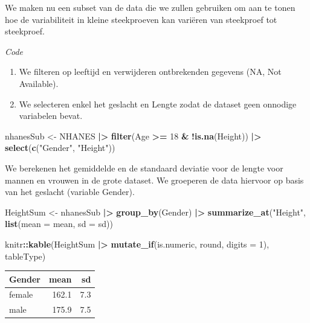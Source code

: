 \documentclass[
  12pt,dutch]{book}
\newenvironment{Shaded}{\begin{snugshade}}{\end{snugshade}}
\newcommand{\AttributeTok}[1]{\textcolor[rgb]{0.13,0.29,0.53}{#1}}
\newcommand{\DecValTok}[1]{\textcolor[rgb]{0.00,0.00,0.81}{#1}}
\newcommand{\FunctionTok}[1]{\textcolor[rgb]{0.13,0.29,0.53}{\textbf{#1}}}
\newcommand{\NormalTok}[1]{#1}
\newcommand{\OtherTok}[1]{\textcolor[rgb]{0.56,0.35,0.01}{#1}}
\newcommand{\SpecialCharTok}[1]{\textcolor[rgb]{0.81,0.36,0.00}{\textbf{#1}}}
\newcommand{\StringTok}[1]{\textcolor[rgb]{0.31,0.60,0.02}{#1}}
\providecommand{\tightlist}{%
  \setlength{\itemsep}{0pt}\setlength{\parskip}{0pt}}
\theoremstyle{definition}
\theoremstyle{definition}
\theoremstyle{definition}
\theoremstyle{definition}
\theoremstyle{remark}
\begin{document}
We maken nu een subset van de data die we zullen gebruiken om aan te tonen hoe de variabiliteit in kleine steekproeven kan variëren van steekproef tot steekproef.

\emph{Code}

\begin{enumerate}
\def\labelenumi{\arabic{enumi}.}
\tightlist
\item
  We filteren op leeftijd en verwijderen ontbrekenden gegevens (NA, Not Available).
\item
  We selecteren enkel het geslacht en Lengte zodat de dataset geen onnodige variabelen bevat.
\end{enumerate}

\begin{Shaded}
\begin{Highlighting}[]
\NormalTok{nhanesSub }\OtherTok{\textless{}{-}}\NormalTok{ NHANES }\SpecialCharTok{|\textgreater{}}
    \FunctionTok{filter}\NormalTok{(Age }\SpecialCharTok{\textgreater{}=} \DecValTok{18} \SpecialCharTok{\&} \SpecialCharTok{!}\FunctionTok{is.na}\NormalTok{(Height)) }\SpecialCharTok{|\textgreater{}}
    \FunctionTok{select}\NormalTok{(}\FunctionTok{c}\NormalTok{(}\StringTok{"Gender"}\NormalTok{, }\StringTok{"Height"}\NormalTok{))}
\end{Highlighting}
\end{Shaded}

We berekenen het gemiddelde en de standaard deviatie voor de lengte voor mannen en vrouwen in de grote dataset.
We groeperen de data hiervoor op basis van het geslacht (variable Gender).

\begin{Shaded}
\begin{Highlighting}[]
\NormalTok{HeightSum }\OtherTok{\textless{}{-}}\NormalTok{ nhanesSub }\SpecialCharTok{|\textgreater{}}
    \FunctionTok{group\_by}\NormalTok{(Gender) }\SpecialCharTok{|\textgreater{}}
    \FunctionTok{summarize\_at}\NormalTok{(}\StringTok{"Height"}\NormalTok{, }\FunctionTok{list}\NormalTok{(}\AttributeTok{mean =}\NormalTok{ mean, }\AttributeTok{sd =}\NormalTok{ sd))}

\NormalTok{knitr}\SpecialCharTok{::}\FunctionTok{kable}\NormalTok{(HeightSum }\SpecialCharTok{|\textgreater{}}
    \FunctionTok{mutate\_if}\NormalTok{(is.numeric, round, }\AttributeTok{digits =} \DecValTok{1}\NormalTok{), tableType)}
\end{Highlighting}
\end{Shaded}

\begin{tabular}{l|r|r}
\hline
Gender & mean & sd\\
\hline
female & 162.1 & 7.3\\
\hline
male & 175.9 & 7.5\\
\hline
\end{tabular}
\end{document}

